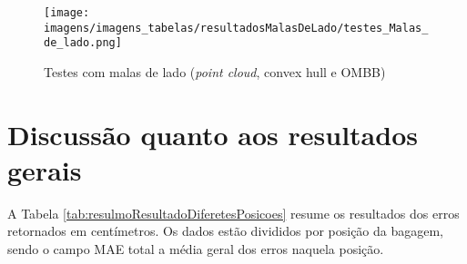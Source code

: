        \begin{figure}[h]
           \centering
           \texttt{[image: imagens/imagens\_tabelas/resultadosMalasDeLado/testes\_Malas\_de\_lado.png]} 
           \caption{Testes com malas de lado (\textit{point cloud}, convex hull e OMBB)}
           \label{fig:Malas_DeLado}
        \end{figure}


\begin{table}[h!]
\centering
{}
\caption{Resultado da exatidão do protótipo, malas de lado}
\label{tab:Resultado da precisão do protótipo, malas de lado}
\end{table}





\section{Discussão quanto aos resultados gerais}
\label{sec_Discussão quanto aos resultados gerais}

A Tabela \ref{tab:resulmoResultadoDiferetesPosicoes} resume os resultados dos erros retornados em centímetros. Os dados estão divididos por posição da bagagem, sendo o campo MAE total a média geral dos erros naquela posição.



